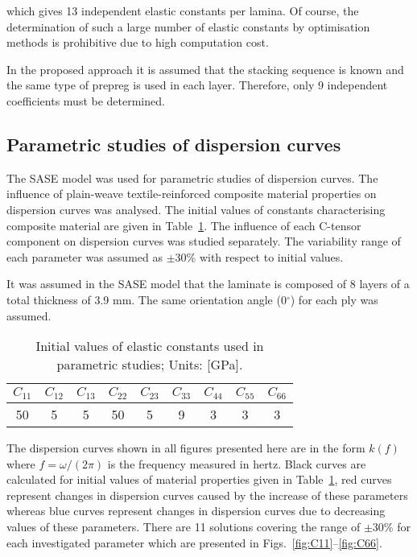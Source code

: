 \documentclass[preprint,12pt]{elsarticle}
\begin{document}
 which gives 13 independent elastic constants per lamina. 
 Of course, the determination of such a large number of elastic constants by optimisation methods is prohibitive due to high computation cost. 
 
 In the proposed approach it is assumed that the stacking sequence is known and the same type of prepreg is used in each layer.
 Therefore, only 9 independent coefficients must be determined.
 \subsection{Parametric studies of dispersion curves \label{sec:parametric}}
 The SASE model was used for parametric studies of dispersion curves. The influence 
 of plain-weave textile-reinforced composite material properties on dispersion curves 
 was analysed.
 The initial values of constants characterising composite material are given in Table~\ref{tab:matprop}. 
 The influence of each C-tensor component on dispersion curves was studied separately. 
 The variability range of each parameter was assumed as \(\pm\)30\% with 
 respect to initial values. 
 
 It was assumed in the SASE model that the laminate is composed of 8 layers of a total thickness of 3.9 mm. 
 The same orientation angle (0\(^{\circ}\)) for each ply was assumed. 
 
 \begin{table}[h!]
 	\renewcommand{\arraystretch}{1.3}
 	\caption{Initial values of elastic constants used in parametric studies; Units: [GPa].}
 	\begin{center}
 		\begin{tabular}{ccccccccc} 
 			\toprule
 			\(C_{11}\) & \(C_{12}\) & \(C_{13}\)  & \(C_{22}\) & \(C_{23}\) & \(C_{33}\) & 
 			\(C_{44}\)  & \(C_{55}\) & \(C_{66}\) \\
 			\midrule
 			50 &5& 5&  50 & 5 & 9 & 3 & 3 & 3\\
 			\bottomrule 
 		\end{tabular} 
 	\end{center}
  	\label{tab:matprop}
 \end{table}
 
The dispersion curves shown in all figures presented here are in the form \(k(f)\) where \(f=\omega/(2 \pi)\) is the frequency measured in hertz. 
Black curves are calculated for initial values of material properties given in Table~\ref{tab:matprop}, red curves represent changes in dispersion curves caused by the increase of these parameters whereas blue curves represent changes in dispersion curves due to decreasing values of these parameters. 
There are 11 solutions covering the range of \(\pm\)30\% for each investigated parameter which are presented in Figs.~\ref{fig:C11}--\ref{fig:C66}.
\end{document}
